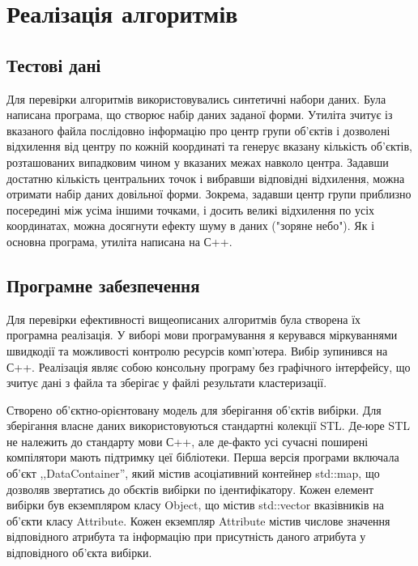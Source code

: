 \chapter{Реалізація алгоритмів}             
            
    \section {Тестові дані}
            Для перевірки алгоритмів використовувались синтетичні набори даних. Була написана програма, що створює набір даних заданої форми. Утиліта зчитує із вказаного файла послідовно інформацію про центр групи об'єктів і дозволені відхилення від центру по кожній координаті та генерує вказану кількість об'єктів, розташованих випадковим чином у вказаних межах навколо центра. Задавши достатню кількість центральних точок і вибравши відповідні відхилення, можна отримати набір даних довільної форми. Зокрема, задавши центр групи приблизно посередині між усіма іншими точками, і досить великі відхилення по усіх координатах, можна досягнути ефекту шуму в даних ("зоряне небо"). Як і основна програма, утиліта написана на С++.
            
               
        \section {Програмне забезпечення}
            Для перевірки ефективності вищеописаних алгоритмів була створена їх програмна реалізація. У виборі мови програмування я керувався міркуваннями швидкодії та можливості контролю ресурсів комп'ютера. Вибір зупинився на С++. Реалізація являє собою консольну програму без графічного інтерфейсу, що зчитує дані з файла та зберігає у файлі результати кластеризації.
            
            
            Створено об'єктно-орієнтовану модель для зберігання об'єктів вибірки. Для зберігання власне даних використовуються стандартні колекції STL. Де-юре STL не належить до стандарту мови С++, але де-факто усі сучасні поширені компілятори мають підтримку цеї бібліотеки. Перша версія програми включала об'єкт ,,DataContainer'', який містив асоціативний контейнер std::map, що дозволяв звертатись до обєктів вибірки по ідентифікатору. Кожен елемент вибірки був екземпляром класу Object, що містив std::vector вказівників на об'єкти класу Attribute. Кожен екземпляр Attribute містив числове значення відповідного атрибута та інформацію при присутність даного атрибута у відповідного об'єкта вибірки.
            
